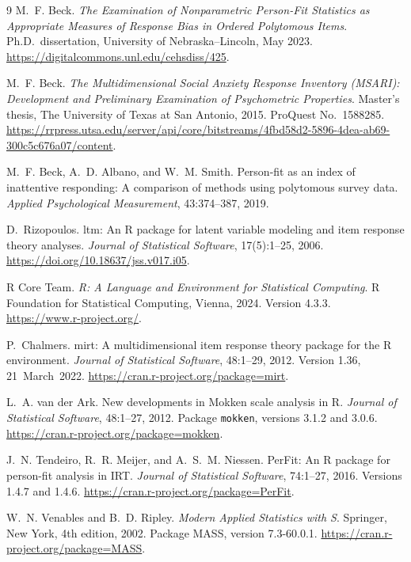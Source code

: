 \documentclass[11pt]{article}
\begin{document}
\begin{thebibliography}{9}
M.~F. Beck.
\emph{The Examination of Nonparametric Person-Fit Statistics as
Appropriate Measures of Response Bias in Ordered Polytomous Items}.
Ph.D.\ dissertation, University of Nebraska--Lincoln, May 2023.
\url{https://digitalcommons.unl.edu/cehsdiss/425}.

M.~F. Beck.
\emph{The Multidimensional Social Anxiety Response Inventory (MSARI):
Development and Preliminary Examination of Psychometric Properties}.
Master's thesis, The University of Texas at San Antonio, 2015.
ProQuest No.~1588285.
\url{https://rrpress.utsa.edu/server/api/core/bitstreams/4fbd58d2-5896-4dea-ab69-300c5c676a07/content}.

M.~F. Beck, A.~D. Albano, and W.~M. Smith.
Person-fit as an index of inattentive responding: A comparison of
methods using polytomous survey data.
\emph{Applied Psychological Measurement}, 43:374--387, 2019.

D.~Rizopoulos.
ltm: An R package for latent variable modeling and item response
theory analyses.
\emph{Journal of Statistical Software}, 17(5):1--25, 2006.
\url{https://doi.org/10.18637/jss.v017.i05}.

R Core Team.
\emph{R: A Language and Environment for Statistical Computing}.
R Foundation for Statistical Computing, Vienna, 2024.
Version 4.3.3.
\url{https://www.r-project.org/}.

P.~Chalmers.
mirt: A multidimensional item response theory package for the R
environment.
\emph{Journal of Statistical Software}, 48:1--29, 2012.
Version 1.36, 21~March~2022.
\url{https://cran.r-project.org/package=mirt}.

L.~A. van der Ark.
New developments in Mokken scale analysis in R.
\emph{Journal of Statistical Software}, 48:1--27, 2012.
Package \texttt{mokken}, versions 3.1.2 and 3.0.6.
\url{https://cran.r-project.org/package=mokken}.

J.~N. Tendeiro, R.~R. Meijer, and A.~S.~M. Niessen.
PerFit: An R package for person-fit analysis in IRT.
\emph{Journal of Statistical Software}, 74:1--27, 2016.
Versions 1.4.7 and 1.4.6.
\url{https://cran.r-project.org/package=PerFit}.

W.~N. Venables and B.~D. Ripley.
\emph{Modern Applied Statistics with S}.
Springer, New York, 4th edition, 2002.
Package MASS, version 7.3-60.0.1.
\url{https://cran.r-project.org/package=MASS}.
\end{thebibliography}
\end{document}
